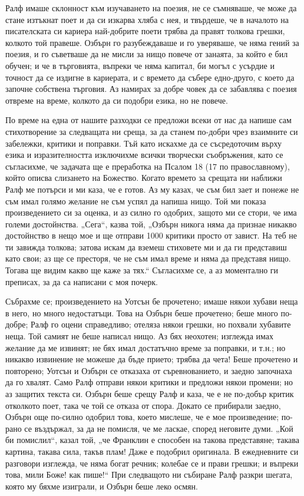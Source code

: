 \documentclass[12pt]{book}
\begin{document}
Ралф имаше склонност към изучаването на поезия, не се съмняваше, че може да стане изтъкнат поет и да си изкарва хляба с нея, и твърдеше, че в началото на писателската си кариера най-добрите поети трябва да правят толкова грешки, колкото той правеше. Озбърн го разубеждаваше и го уверяваше, че няма гений за поезия, и го съветваше да не мисли за нищо повече от занаята, за който е бил обучен; и че в търговията, въпреки че няма капитал, би могъл с усърдие и точност да се издигне в кариерата, и с времето да събере едно-друго, с което да започне собствена търговия. Аз намирах за добре човек да се забавлява с поезия отвреме на време, колкото да си подобри езика, но не повече.

По време на една от нашите разходки се предложи всеки от нас да напише сам стихотворение за следващата ни среща, за да станем по-добри чрез взаимните си забележки, критики и поправки. Тъй като искахме да се съсредоточим върху езика и изразителността изключихме всички творчески съобръжения, като се съгласихме, че задачата ще е преработка на Псалом 18 (17 по православному), който описва слизането на Божество. Когато времето за срещата ни наближи Ралф ме потърси и ми каза, че е готов. Аз му казах, че съм бил зает и понеже не съм имал голямо желание не съм успял да напиша нищо. Той ми показа произведението си за оценка, и аз силно го одобрих, защото ми се стори, че има големи достойнства. „Сега“, казва той, „Озбърн никога няма да признае никакво достойнство в нещо мое и ще отправи 1000 критики просто от завист. На теб не ти завижда толкова; затова искам да вземеш стиховете ми и да ги представиш като свои; аз ще се престоря, че не съм имал време и няма да представя нищо. Тогава ще видим какво ще каже за тях.“ Съгласихме се, а аз моментално ги преписах, за да са написани с моя почерк. 

Събрахме се; произведението на Уотсън бе прочетено; имаше някои хубави неща в него, но много недостатъци. Това на Озбърн беше прочетено; беше много по-добре; Ралф го оцени справедливо; отеляза някои грешки, но похвали хубавите неща. Той  самият не беше написал нищо. Аз бях неохотен; изглежда имах желание да ме извинят; не бях имал достатъчно време за поправки, и т.н.; но никакво извинение не можеше да бъде прието; трябва да чета! Беше прочетено и повторено; Уотсън и Озбърн се отказаха от съревнованието, и заедно започнаха да го хвалят. Само Ралф отправи някои критики и предложи някои промени; но аз защитих текста си. Озбърн беше срещу Ралф и каза, че е не по-добър критик отколкото поет, така че той се отказа от спора. Докато се прибирали заедно, Озбърн още по-силно одобрил това, което мислеше, че е мое произведение; по-рано се въздържал, за да не помисля, че ме ласкае, според неговите думи. „Кой би помислил“, казал той, „че Франклин е способен на такова представяне; такава картина, такава сила, такъв плам! Даже е подобрил оригинала. В ежедневните си разговори изглежда, че няма богат речник; колебае се и прави грешки; и въпреки това, мили Боже! как пише!“ При следващото ни събиране Ралф разкри шегата, която му бяхме изиграли, и Озбърн беше леко осмян.
\end{document}
